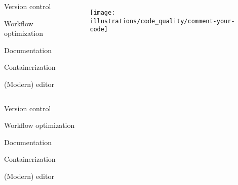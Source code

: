 \documentclass[usenames,dvipsnames]{beamer}
\theoremstyle{plain}
\theoremstyle{definition}
\begin{document}

\begin{frame}{\setframetitle{}}
  
  \begin{columns}[t]
    
    \begin{itemize}
      \item \textcolor{bg!85!normal text.fg}{Version control
      \item Workflow optimization  } 
      \item Documentation
      \textcolor{bg!85!normal text.fg}
      {\item Containerization
      \item (Modern) editor} 
    \end{itemize}
    
    \begin{figure}
      \captionsetup[subfigure]{justification=centering}
      \centering
      \subcaptionbox{}
      {\texttt{[image: illustrations/code\_quality/comment-your-code]}}
    \end{figure}
  \end{columns}
  
\end{frame}




\begin{frame}{\setframetitle{}}
  
  \begin{columns}[t]
    
    \begin{itemize}
      \item \textcolor{bg!85!normal text.fg}{Version control
      \item Workflow optimization   
      \item Documentation}
      \item Containerization  
      \textcolor{bg!85!normal text.fg}
      {\item (Modern) editor} 
    \end{itemize}
    
    \begin{figure}
      {}
    \end{figure}
  \end{columns}
  
\end{frame}
\end{document}
